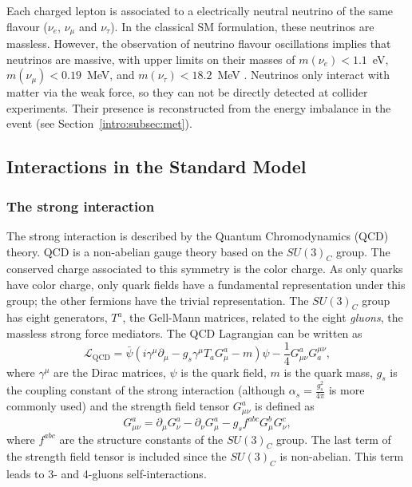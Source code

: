 \documentclass[../main.tex]{subfiles}
\begin{document}
Each charged lepton is associated to a electrically neutral neutrino of the same flavour ($\nu_e$, $\nu_\mu$ and $\nu_\tau$). In the classical SM formulation, these neutrinos are massless. However, the observation of neutrino flavour oscillations \cite{intro:theo:nu_oscillations} implies that neutrinos are massive, with upper limits on their masses of $m(\nu_e)<1.1$~eV, $m(\nu_\mu)<0.19$~MeV, and $m(\nu_\tau)<18.2$~MeV \cite{pdg}. Neutrinos only interact with matter via the weak force, so they can not be directly detected at collider experiments. Their presence is reconstructed from the energy imbalance in the event (see Section~\ref{intro:subsec:met}).

\subsection{Interactions in the Standard Model}

\subsubsection{The strong interaction}

The strong interaction is described by the Quantum Chromodynamics (QCD) theory. QCD is a non-abelian gauge theory based on the $SU(3)_C$ group. The conserved charge associated to this symmetry is the color charge. As only quarks have color charge, only quark fields have a fundamental representation under this group; the other fermions have the trivial representation. The $SU(3)_C$ group has eight generators, $T^a$, the Gell-Mann matrices, related to the eight \textit{gluons}, the massless strong force mediators. The QCD Lagrangian can be written as
\begin{equation}
\mathcal{L}_{\text{QCD}} = \bar{\psi}\left(i\gamma^\mu\partial_\mu - g_s\gamma^\mu T_a G^a_\mu - m\right)\psi - \frac{1}{4}G_{\mu\nu}^a G_a^{\mu\nu},
\end{equation}
where $\gamma^\mu$ are the Dirac matrices,  $\psi$ is the quark field, $m$ is the quark mass, $g_s$ is the coupling constant of the strong interaction (although $\alpha_s = \frac{g_s^2}{4\pi}$ is more commonly used) and the strength field tensor $G_{\mu\nu}^a$ is defined as 
\begin{equation}
G_{\mu\nu}^a = \partial_\mu G_\nu^a - \partial_\nu G_\mu^a - g_s f^{abc} G_\mu^b G_\nu^c,
\end{equation}
where $f^{abc}$ are the structure constants of the $SU(3)_C$ group. The last term of the strength field tensor is included since the $SU(3)_C$ is non-abelian. This term leads to 3- and 4-gluons self-interactions.
\end{document}
